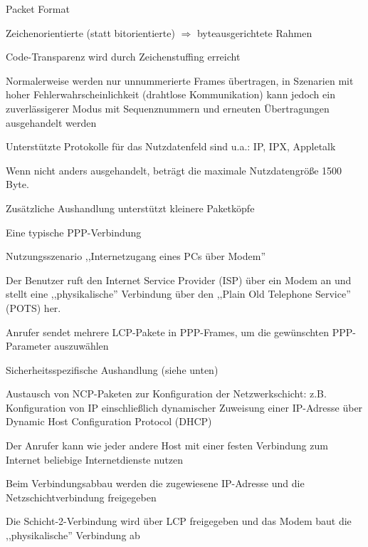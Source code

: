 \documentclass[a4paper]{article}
\begin{document}
\begin{multicols}{3}
      Packet Format
      \begin{itemize*}
            \item Zeichenorientierte (statt bitorientierte) $\Rightarrow$ byteausgerichtete Rahmen
            \item Code-Transparenz wird durch Zeichenstuffing erreicht
            \item Normalerweise werden nur unnummerierte Frames übertragen, in Szenarien mit hoher Fehlerwahrscheinlichkeit (drahtlose Kommunikation) kann jedoch ein zuverlässigerer Modus mit Sequenznummern und erneuten Übertragungen ausgehandelt werden
            \item Unterstützte Protokolle für das Nutzdatenfeld sind u.a.: IP, IPX, Appletalk
            \item Wenn nicht anders ausgehandelt, beträgt die maximale Nutzdatengröße 1500 Byte.
            \item Zusätzliche Aushandlung unterstützt kleinere Paketköpfe
      \end{itemize*}

      Eine typische PPP-Verbindung
      \begin{itemize*}
            \item Nutzungsszenario ,,Internetzugang eines PCs über Modem''
            \begin{itemize*}
                  \item Der Benutzer ruft den Internet Service Provider (ISP) über ein Modem an und stellt eine ,,physikalische'' Verbindung über den ,,Plain Old Telephone Service'' (POTS) her.
                  \item Anrufer sendet mehrere LCP-Pakete in PPP-Frames, um die gewünschten PPP-Parameter auszuwählen
                  \item Sicherheitsspezifische Aushandlung (siehe unten)
                  \item Austausch von NCP-Paketen zur Konfiguration der Netzwerkschicht: z.B. Konfiguration von IP einschließlich dynamischer Zuweisung einer IP-Adresse über Dynamic Host Configuration Protocol (DHCP)
                  \item Der Anrufer kann wie jeder andere Host mit einer festen Verbindung zum Internet beliebige Internetdienste nutzen
                  \item Beim Verbindungsabbau werden die zugewiesene IP-Adresse und die Netzschichtverbindung freigegeben
                  \item Die Schicht-2-Verbindung wird über LCP freigegeben und das Modem baut die ,,physikalische'' Verbindung ab
            \end{itemize*}
      \end{itemize*}


\end{multicols}
\end{document}
